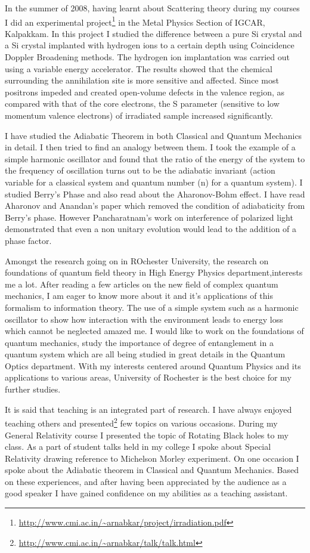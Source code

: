 \documentclass[12pt,a4paper,oneside]{amsart}
\begin{document}
In the summer of 2008, having learnt about Scattering theory during my courses I did an experimental project\footnote{\url{http://www.cmi.ac.in/~arnabkar/project/irradiation.pdf}} in the Metal Physics Section of IGCAR, Kalpakkam. In this project I studied the difference between a pure Si crystal and a Si crystal implanted with hydrogen ions to a certain depth using Coincidence Doppler Broadening methods. The hydrogen ion implantation was carried out using a variable energy accelerator. The results showed that the chemical surrounding the annihilation site is more sensitive and affected. Since most positrons impeded and created open-volume defects in the valence region, as compared with that of the core electrons, the S parameter (sensitive to low momentum valence electrons) of irradiated sample increased significantly.

I have studied the Adiabatic Theorem in both Classical and Quantum Mechanics in detail. I then tried to find an analogy between them. I took the example of a simple harmonic oscillator and found that the ratio of the energy of the system to the frequency of oscillation turns out to be the adiabatic invariant (action variable for a classical system and quantum number (n) for a quantum system). I studied Berry's Phase and also read about the Aharonov-Bohm effect. I have read Aharonov and Anandan's paper which removed the condition of adiabaticity from Berry's phase. However Pancharatnam's work on interference of polarized light demonstrated that even a non unitary evolution would lead to the addition of a phase factor.

Amongst the research going on in ROchester University, the research on foundations of quantum field theory in High Energy Physics department,interests me a lot. After reading a few articles on the new field of complex quantum mechanics, I am eager to know more about it and it's applications of this formalism to information theory. The use of a simple system such as a harmonic oscillator to show how interaction with the environment leads to energy loss which cannot be neglected amazed me. I would like to work on the foundations of quantum mechanics, study the importance of degree of entanglement in a quantum system which are all being studied in great details in the Quantum Optics department. With my interests centered around Quantum Physics and its applications to various areas, University of Rochester is the best choice for my further studies.

It is said that teaching is an integrated part of research. I have always enjoyed teaching others and presented\footnote{\url{http://www.cmi.ac.in/\~arnabkar/talk/talk.html}} few topics on various occasions. During my General Relativity course I presented the topic of Rotating Black holes to my class. As a part of student talks held in my college I spoke about Special Relativity drawing reference to Michelson Morley experiment. On one occasion I spoke about the Adiabatic theorem in Classical and Quantum Mechanics. Based on these experiences, and after having been appreciated by the audience as a good speaker I have gained confidence on my abilities as a teaching assistant.
\end{document}
